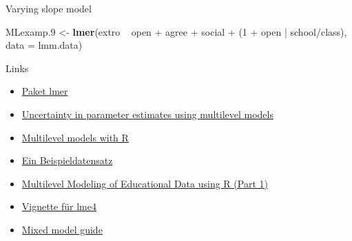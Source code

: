 \documentclass[ignorenonframetext,]{beamer}
\newenvironment{Shaded}{}{}
\newcommand{\KeywordTok}[1]{\textcolor[rgb]{0.00,0.44,0.13}{\textbf{{#1}}}}
\newcommand{\DataTypeTok}[1]{\textcolor[rgb]{0.56,0.13,0.00}{{#1}}}
\newcommand{\DecValTok}[1]{\textcolor[rgb]{0.25,0.63,0.44}{{#1}}}
\newcommand{\FloatTok}[1]{\textcolor[rgb]{0.25,0.63,0.44}{{#1}}}
\newcommand{\StringTok}[1]{\textcolor[rgb]{0.25,0.44,0.63}{{#1}}}
\newcommand{\NormalTok}[1]{{#1}}
\begin{document}
\begin{frame}[fragile]{Varying slope model}

\begin{Shaded}
\begin{Highlighting}[]
\NormalTok{MLexamp}\FloatTok{.9} \NormalTok{<-}\StringTok{ }\KeywordTok{lmer}\NormalTok{(extro ~}\StringTok{ }\NormalTok{open +}\StringTok{ }\NormalTok{agree +}\StringTok{ }\NormalTok{social +}\StringTok{ }\NormalTok{(}\DecValTok{1} \NormalTok{+}\StringTok{ }\NormalTok{open |}\StringTok{ }\NormalTok{school/class), }\DataTypeTok{data =} \NormalTok{lmm.data)}
\end{Highlighting}
\end{Shaded}

\end{frame}

\begin{frame}{Links}

\begin{itemize}
\item
  \href{https://cran.r-project.org/doc/contrib/Bliese_Multilevel.pdf}{Paket
  lmer}
\item
  \href{https://www.r-bloggers.com/uncertainty-in-parameter-estimates-using-multilevel-models/}{Uncertainty
  in parameter estimates using multilevel models}
\item
  \href{https://cran.r-project.org/doc/contrib/Bliese_Multilevel.pdf}{Multilevel
  models with R}
\item
  \href{https://www.jaredknowles.com/journal/2013/11/25/getting-started-with-mixed-effect-models-in-r}{Ein
  Beispieldatensatz}
\item
  \href{https://www.r-bloggers.com/multilevel-modeling-of-educational-data-using-r-part-1/}{Multilevel
  Modeling of Educational Data using R (Part 1)}
\item
  \href{https://cran.r-project.org/web/packages/lme4/vignettes/lmer.pdf}{Vignette
  für lme4}
\item
  \href{http://ase.tufts.edu/gsc/gradresources/guidetomixedmodelsinr/mixed\%20model\%20guide.html}{Mixed
  model guide}
\end{itemize}

\end{frame}
\end{document}
